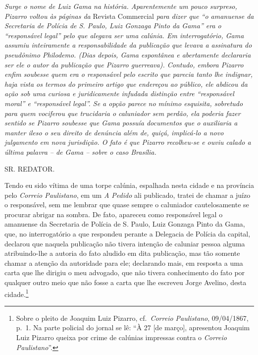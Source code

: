 \begin{didascalia}
\emph{Surge o nome de Luiz Gama na história. Aparentemente um pouco
surpreso, Pizarro voltou às páginas da} Revista Commercial \emph{para
dizer que ``o amanuense da Secretaria de Polícia de S. Paulo, Luiz
Gonzaga Pinto da Gama'' era o ``responsável legal'' pelo que alegava ser
uma calúnia. Em interrogatório, Gama assumiu inteiramente a
responsabilidade da publicação que levava a assinatura do pseudônimo
Philodemo. (Dias depois, Gama espontânea e abertamente declararia ser
ele o autor da publicação que Pizarro guerreava). Contudo, embora
Pizarro enfim soubesse quem era o responsável pelo escrito que parecia
tanto lhe indignar, haja vista os termos do primeiro artigo que
endereçou ao público, ele abdicou da ação sob uma curiosa e
juridicamente infudada distinção entre ``responsável moral'' e
``responsável legal''. Se a opção parece no mínimo esquisita, sobretudo
para quem vociferou que trucidaria o caluniador sem perdão, ela poderia
fazer sentido se Pizarro soubesse que Gama possuía documentos que o
auxiliaria a manter ileso o seu direito de denúncia além de, quiçá,
implicá-lo a novo julgamento em nova jurisdição. O fato é que Pizarro
recolheu-se e ouviu calado a última palavra -- de Gama -- sobre o caso
Brasília.}
\end{didascalia}

\asterisc{}

SR. REDATOR.

Tendo eu sido vítima de uma torpe calúnia, espalhada nesta cidade e na
província pelo \emph{Correio Paulistano}, em um \emph{A Pedido} ali
publicado, tratei de chamar a juízo o responsável, sem me lembrar que
quase sempre o caluniador cautelosamente se procurar abrigar na sombra.
De fato, apareceu como responsável legal o amanuense da Secretaria de
Polícia de S. Paulo, Luiz Gonzaga Pinto da Gama, que, no interrogatório
a que respondeu perante a Delegacia de Polícia da capital, declarou que
naquela publicação não tivera intenção de caluniar pessoa alguma
atribuindo-lhe a autoria do fato aludido em dita publicação, mas tão
somente chamar a atenção da autoridade para ele; declarando mais, em
resposta a uma carta que lhe dirigiu o meu advogado, que não tivera
conhecimento do fato por qualquer outro meio que não fosse a carta que
lhe escreveu Jorge Avelino, desta cidade.\footnote{ Sobre o pleito de
  Joaquim Luiz Pizarro, cf.~\emph{Correio Paulistano}, 09/04/1867, p.~1.
  Na parte policial do jornal se lê: ``À 27 {[}de março{]}, apresentou
  Joaquim Luiz Pizarro queixa por crime de calúnias impressas contra o
  \emph{Correio Paulistano}''.}

